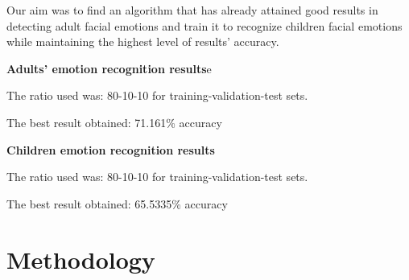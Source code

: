 \documentclass[runningheads,a4paper,11pt]{report}
\begin{document}
Our aim was to find an algorithm that has already attained good results in detecting adult facial emotions and train it to recognize children facial emotions while maintaining the highest level of results' accuracy.  \newline

\textbf{Adults' emotion recognition results}e

The ratio used was: 80-10-10 for training-validation-test sets.

The best result obtained:  71.161\% accuracy \cite{adultdata}\newline

\textbf{Children emotion recognition results}

The ratio used was: 80-10-10 for training-validation-test sets.

The best result obtained:  65.5335\% accuracy \newline


\section{Methodology}
\label{section:methodology}
\end{document}

